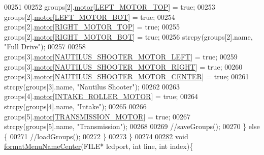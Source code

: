 \begin{DoxyCode}
00251 
00252         groups[2].\hyperlink{struct_motor_group_a05d10a69eb1ae279fab13f9a009d84be}{motor}[\hyperlink{motors_8h_a3e06fbce97caed16e0a0f27f544587af}{LEFT\_MOTOR\_TOP}] = \textcolor{keyword}{true};
00253         groups[2].\hyperlink{struct_motor_group_a05d10a69eb1ae279fab13f9a009d84be}{motor}[\hyperlink{motors_8h_a43691a92e03fa5319b14f01193f47b9a}{LEFT\_MOTOR\_BOT}] = \textcolor{keyword}{true};
00254         groups[2].\hyperlink{struct_motor_group_a05d10a69eb1ae279fab13f9a009d84be}{motor}[\hyperlink{motors_8h_a306c5923dd0328c4bfc09255de9d124c}{RIGHT\_MOTOR\_TOP}] = \textcolor{keyword}{true};
00255         groups[2].\hyperlink{struct_motor_group_a05d10a69eb1ae279fab13f9a009d84be}{motor}[\hyperlink{motors_8h_a85c904d091f71ba7fc53a446524b6c61}{RIGHT\_MOTOR\_BOT}] = \textcolor{keyword}{true};
00256         strcpy(groups[2].name, \textcolor{stringliteral}{"Full Drive"});
00257 
00258         groups[3].\hyperlink{struct_motor_group_a05d10a69eb1ae279fab13f9a009d84be}{motor}[\hyperlink{motors_8h_a4a9fed3366effbbb942b907c131ae8bd}{NAUTILUS\_SHOOTER\_MOTOR\_LEFT}] = \textcolor{keyword}{true};
00259         groups[3].\hyperlink{struct_motor_group_a05d10a69eb1ae279fab13f9a009d84be}{motor}[\hyperlink{motors_8h_a3fa3054b1d74b733800c7b9252362334}{NAUTILUS\_SHOOTER\_MOTOR\_RIGHT}] = \textcolor{keyword}{true};
00260         groups[3].\hyperlink{struct_motor_group_a05d10a69eb1ae279fab13f9a009d84be}{motor}[\hyperlink{motors_8h_a681ecbcdbf9007fc5ccf3d67cdcfb505}{NAUTILUS\_SHOOTER\_MOTOR\_CENTER}] = \textcolor{keyword}{true};
00261         strcpy(groups[3].name, \textcolor{stringliteral}{"Nautilus Shooter"});
00262 
00263         groups[4].\hyperlink{struct_motor_group_a05d10a69eb1ae279fab13f9a009d84be}{motor}[\hyperlink{motors_8h_a8ac783dc4e09804d3b2f7e3b6bbecad7}{INTAKE\_ROLLER\_MOTOR}] = \textcolor{keyword}{true};
00264         strcpy(groups[4].name, \textcolor{stringliteral}{"Intake"});
00265 
00266         groups[5].\hyperlink{struct_motor_group_a05d10a69eb1ae279fab13f9a009d84be}{motor}[\hyperlink{motors_8h_a7d8ac8902b66bb442bb27f9899aef13e}{TRANSMISSION\_MOTOR}] = \textcolor{keyword}{true};
00267         strcpy(groups[5].name, \textcolor{stringliteral}{"Transmission"});
00268 
00269         \textcolor{comment}{//saveGroups();}
00270     \} \textcolor{keywordflow}{else} \{
00271         \textcolor{comment}{//loadGroups();}
00272     \}
00273 \}
00274 
\hypertarget{lcddiag_8c_source.tex_l00282}{}\hyperlink{lcddiag_8c_a465a6cd66cde04199ae9641acce59d52}{00282} \textcolor{keywordtype}{void} \hyperlink{lcddiag_8c_a465a6cd66cde04199ae9641acce59d52}{formatMenuNameCenter}(FILE* lcdport, \textcolor{keywordtype}{int} line, \textcolor{keywordtype}{int} index)\{

\end{DoxyCode}
